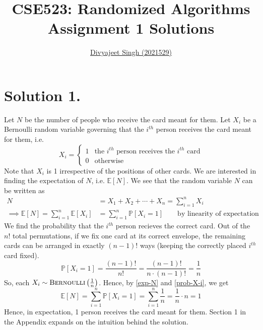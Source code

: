 \documentclass[9pt]{article}
\title{
    \textbf{CSE523: Randomized Algorithms} \\
    \textbf{\large{Assignment 1 Solutions}} %
}
\author{
    \href{mailto:divyajeet21529@iiitd.ac.in}{Divyajeet Singh (2021529)}
}
\date{}
\begin{document}
\maketitle

\section*{\textbf{Solution 1.}}
Let $N$ be the number of people who receive the card meant for them. Let $X_{i}$ be a Bernoulli
random variable governing that the $i^{th}$ person receives the card meant for them, i.e.
\begin{equation}
    \label{X-i}
    X_{i} = \begin{cases}
        1 & \text{the } i^{th} \text{ person receives the } i^{th} \text{ card} \\
        0 & \text{otherwise}
    \end{cases}
\end{equation}
Note that $X_{i}$ is 1 irrespective of the positions of other cards. We are interested in finding
the expectation of $N$, i.e. $\mathbb{E}[N]$. We see that the random variable $N$ can be written as
\begin{align}
    \label{N}
    N &= X_{1} + X_{2} + \cdots + X_{n} = \sum_{i=1}^{n} X_{i} \\
    \label{exp-N}
    \implies \mathbb{E}[N] = \sum_{i=1}^{n} \mathbb{E}[X_{i}] &= \sum_{i=1}^{n} \mathbb{P}[X_{i} = 1]
    \qquad \text{by linearity of expectation}
\end{align}
We find the probability that the $i^{th}$ person recieves the correct card. Out of the $n!$
total permutations, if we fix one card at its correct envelope, the remaining cards can be
arranged in exactly $(n-1)!$ ways (keeping the correctly placed $i^{th}$ card fixed).
\begin{equation}
    \label{prob-X-i}
    \mathbb{P}[X_{i} = 1] = \frac{(n-1)!}{n!} = \frac{(n-1)!}{n \cdot (n-1)!} = \frac{1}{n}
\end{equation}
So, each $X_{i} \sim \textsc{Bernoulli}\left(\frac{1}{n}\right)$. Hence, by \eqref{exp-N} and \eqref{prob-X-i}, we get
\begin{equation}
    \label{exp-N-sol}
    \mathbb{E}[N] = \sum_{i=1}^{n} \mathbb{P}[X_{i} = 1] = \sum_{i=1}^{n} \frac{1}{n}
    = \frac{1}{n} \cdot n = 1
\end{equation}
Hence, in expectation, 1 person receives the card meant for them. Section 1 in the Appendix expands
on the intuition behind the solution.
\end{document}
